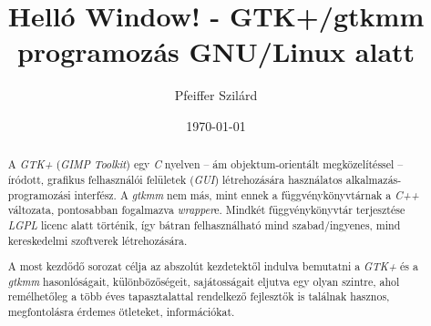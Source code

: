 \documentclass[a4paper,titlepage,10pt]{article}
\title{Helló Window! - GTK+/gtkmm programozás GNU/Linux alatt}
\author{Pfeiffer Szilárd}
\date{\today}
\begin{document}
\newcommand{\lstinputsources}[5][numbers=left]{
\medskip
\noindent
\begin{minipage}{\linewidth}
\begin{center}
\makebox[\linewidth]{
\makebox[5mm]{}

\makebox[10mm]{}

}

\end{center}
\end{minipage}
}

\newcommand{\lstinputsource}[4][]{
\medskip
\noindent
\begin{minipage}{\linewidth}
\begin{center}
\makebox[\linewidth]{

}

\end{center}
\end{minipage}
}

\newcommand{\lstinputsourcesappendix}[5][]{
\noindent
\begin{center}
\begin{minipage}[t][\height][l]{0.57\linewidth}

\end{minipage}
\begin{minipage}[t][\height][r]{0.39\linewidth}

\end{minipage}

\end{center}
}


\begin{titlepage}

\maketitle

\begin{abstract}
A \textit{GTK+} (\textit{GIMP Toolkit}) egy \textit{C} nyelven -- ám objektum-orientált megközelítéssel -- íródott, grafikus felhasználói felületek (\textit{GUI}) létrehozására használatos alkalmazás-programozási interfész. A \textit{gtkmm} nem más, mint ennek a függvénykönyvtárnak a \textit{C++} változata, pontosabban fogalmazva \textit{wrapper}e. Mindkét függvénykönyvtár terjesztése \textit{LGPL} licenc alatt történik, így bátran felhasználható mind szabad/ingyenes, mind kereskedelmi szoftverek létrehozására.

A most kezdődő sorozat célja az abszolút kezdetektől indulva bemutatni a \textit{GTK+} és a \textit{gtkmm} hasonlóságait, különbözőségeit, sajátosságait eljutva egy olyan szintre, ahol remélhetőleg a több éves tapasztalattal rendelkező fejlesztők is találnak hasznos, megfontolásra érdemes ötleteket, információkat.
\end{abstract}

\tableofcontents

\end{titlepage}
\end{document}

